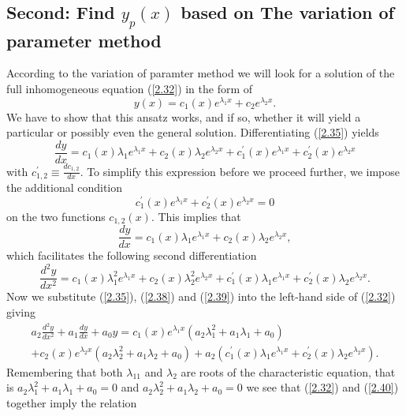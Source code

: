 \documentclass[11pt,a4paper]{article}
\begin{document}
	\subsection*{Second: Find $y_p(x)$ based on The variation of parameter method}
	According to the variation of paramter method we will look for a solution of the full inhomogeneous equation (\ref{2.32}) in the form of
	\begin{equation}\label{2.35}
		y(x) = c_1(x)e^{\lambda_1x} + c_2e^{\lambda_2x}.
	\end{equation}
	We have to show that this ansatz works, and if so, whether it will yield a particular or possibly even the general solution. Differentiating (\ref{2.35}) yields
	\begin{equation}\label{2.36}
		\frac{dy}{dx} = c_1(x)\lambda_1e^{\lambda_1x} + c_2(x)\lambda_2e^{\lambda_2x}+c_1^\prime(x)e^{\lambda_1x} + c_2^\prime(x)e^{\lambda_2x}
	\end{equation}
	with $c_{1,2}^\prime \equiv \frac{dc_{1,2}}{dx}$. To simplify this expression before we proceed further, we impose the additional condition
	\begin{equation}\label{2.37}
		c_1^\prime(x)e^{\lambda_1x}+c_2^\prime(x)e^{\lambda_2x}=0
	\end{equation}
	on the two functions $c_{1,2}(x)$. This implies that
	\begin{equation}\label{2.38}
		\frac{dy}{dx} = c_1(x)\lambda_1e^{\lambda_1x} + c_2(x)\lambda_2e^{\lambda_2x},
	\end{equation}
	which facilitates the following second differentiation
	\begin{equation}\label{2.39}
		\frac{d^2y}{dx^2} = c_1(x)\lambda_1^2e^{\lambda_1x}+c_2(x)\lambda_2^2e^{\lambda_2x}+c_1^\prime(x)\lambda_1e^{\lambda_1x}+c_2^\prime(x)\lambda_2e^{\lambda_2x}.
	\end{equation}
	Now we substitute (\ref{2.35}), (\ref{2.38}) and (\ref{2.39}) into the left-hand side of (\ref{2.32}) giving
	\begin{equation}\label{2.40}
		\begin{gathered}
			a_2\frac{d^2y}{dx^2} + a_1\frac{dy}{dx}+a_0y
			= c_1(x)e^{\lambda_1x}(a_2\lambda_1^2+a_1\lambda_1+a_0)\\
			+ c_2(x)e^{\lambda_2x}(a_2\lambda_2^2+a_1\lambda_2+a_0) + a_2(c_1^\prime(x)\lambda_1e^{\lambda_1x} + c_2^\prime(x)\lambda_2e^{\lambda_2x}).
		\end{gathered}
	\end{equation}
	Remembering that both $\lambda_11$ and $\lambda_2$ are roots of the characteristic equation, that is $a_2\lambda_1^2+a_1\lambda_1+a_0=0$ and $a_2\lambda_2^2+a_1\lambda_2+a_0=0$ we see that (\ref{2.32}) and (\ref{2.40}) together imply the relation
\end{document}
